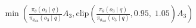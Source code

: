 \documentclass[preview]{standalone}
\begin{document}
\begin{align*}
\min \left(\frac{\pi_\theta(o_3 \mid q)}{\pi_{\theta_{\text{old}}}(o_3 \mid q)} A_3, \text{clip} \left( \frac{\pi_\theta(o_3 \mid q)}{\pi_{\theta_{\text{old}}}(o_3 \mid q)}, 0.95,\; 1.05 \right) A_3 \right)
\end{align*}
\end{document}
